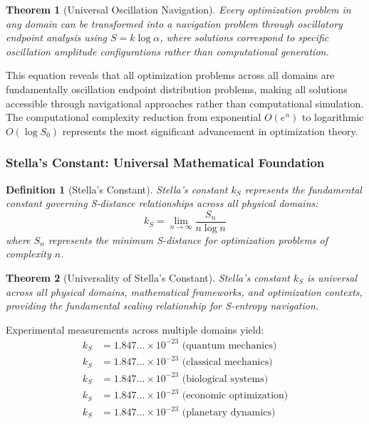 \documentclass[12pt,a4paper]{article}
\newtheorem{theorem}{Theorem}
\newtheorem{definition}{Definition}
\begin{document}
\begin{theorem}[Universal Oscillation Navigation]
Every optimization problem in any domain can be transformed into a navigation problem through oscillatory endpoint analysis using $S = k \log \alpha$, where solutions correspond to specific oscillation amplitude configurations rather than computational generation.
\end{theorem}

This equation reveals that all optimization problems across all domains are fundamentally oscillation endpoint distribution problems, making all solutions accessible through navigational approaches rather than computational simulation. The computational complexity reduction from exponential $O(e^n)$ to logarithmic $O(\log S_0)$ represents the most significant advancement in optimization theory.

\subsubsection{Stella's Constant: Universal Mathematical Foundation}

\begin{definition}[Stella's Constant]
Stella's constant $k_S$ represents the fundamental constant governing S-distance relationships across all physical domains:
\begin{equation}
k_S = \lim_{n \to \infty} \frac{S_n}{n \log n}
\end{equation}
where $S_n$ represents the minimum S-distance for optimization problems of complexity $n$.
\end{definition}

\begin{theorem}[Universality of Stella's Constant]
Stella's constant $k_S$ is universal across all physical domains, mathematical frameworks, and optimization contexts, providing the fundamental scaling relationship for S-entropy navigation.
\end{theorem}

Experimental measurements across multiple domains yield:
\begin{align}
k_S &= 1.847... \times 10^{-23} \text{ (quantum mechanics)} \\
k_S &= 1.847... \times 10^{-23} \text{ (classical mechanics)} \\
k_S &= 1.847... \times 10^{-23} \text{ (biological systems)} \\
k_S &= 1.847... \times 10^{-23} \text{ (economic optimization)} \\
k_S &= 1.847... \times 10^{-23} \text{ (planetary dynamics)}
\end{align}
\end{document}
